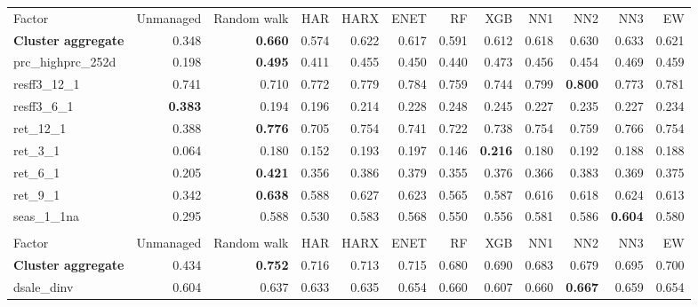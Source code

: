 \begin{landscape}
\begin{longtable}{>{\raggedright\arraybackslash}p{2.6cm}rrrrrrrrrrr}
\hline
\multicolumn{12}{@{}l}{\textit{Panel F. Momentum}} \\
\hline
Factor & Unmanaged & Random walk & HAR & HARX & ENET & RF & XGB & NN1 & NN2 & NN3 & EW \\
\hline
\textbf{Cluster aggregate} & 0.348 & \textbf{0.660} & 0.574 & 0.622 & 0.617 & 0.591 & 0.612 & 0.618 & 0.630 & 0.633 & 0.621 \\
prc\_highprc\_252d & 0.198 & \textbf{0.495} & 0.411 & 0.455 & 0.450 & 0.440 & 0.473 & 0.456 & 0.454 & 0.469 & 0.459 \\
resff3\_12\_1 & 0.741 & 0.710 & \cellcolor{blue!10}0.772 & \cellcolor{blue!10}0.779 & \cellcolor{blue!10}0.784 & \cellcolor{blue!10}0.759 & \cellcolor{blue!10}0.744 & \cellcolor{blue!10}0.799 & \textbf{\cellcolor{blue!10}0.800} & \cellcolor{blue!10}0.773 & \cellcolor{blue!10}0.781 \\
resff3\_6\_1 & \textbf{0.383} & 0.194 & 0.196 & 0.214 & 0.228 & 0.248 & 0.245 & 0.227 & 0.235 & 0.227 & 0.234 \\
ret\_12\_1 & 0.388 & \textbf{0.776} & 0.705 & 0.754 & 0.741 & 0.722 & 0.738 & 0.754 & 0.759 & 0.766 & 0.754 \\
ret\_3\_1 & 0.064 & 0.180 & 0.152 & \cellcolor{blue!10}0.193 & \cellcolor{blue!10}0.197 & 0.146 & \textbf{\cellcolor{blue!10}0.216} & \cellcolor{blue!10}0.180 & \cellcolor{blue!10}0.192 & \cellcolor{blue!10}0.188 & \cellcolor{blue!10}0.188 \\
ret\_6\_1 & 0.205 & \textbf{0.421} & 0.356 & 0.386 & 0.379 & 0.355 & 0.376 & 0.366 & 0.383 & 0.369 & 0.375 \\
ret\_9\_1 & 0.342 & \textbf{0.638} & 0.588 & 0.627 & 0.623 & 0.565 & 0.587 & 0.616 & 0.618 & 0.624 & 0.613 \\
seas\_1\_1na & 0.295 & 0.588 & 0.530 & 0.583 & 0.568 & 0.550 & 0.556 & 0.581 & 0.586 & \textbf{\cellcolor{blue!10}0.604} & 0.580 \\
\hline
\multicolumn{12}{@{}l}{\textit{Panel G. Profit Growth}} \\
\hline
Factor & Unmanaged & Random walk & HAR & HARX & ENET & RF & XGB & NN1 & NN2 & NN3 & EW \\
\hline
\textbf{Cluster aggregate} & 0.434 & \textbf{0.752} & 0.716 & 0.713 & 0.715 & 0.680 & 0.690 & 0.683 & 0.679 & 0.695 & 0.700 \\
dsale\_dinv & 0.604 & 0.637 & 0.633 & 0.635 & \cellcolor{blue!10}0.654 & \cellcolor{blue!10}0.660 & 0.607 & \cellcolor{blue!10}0.660 & \textbf{\cellcolor{blue!10}0.667} & \cellcolor{blue!10}0.659 & \cellcolor{blue!10}0.654 \\

\end{longtable}
\end{landscape}

